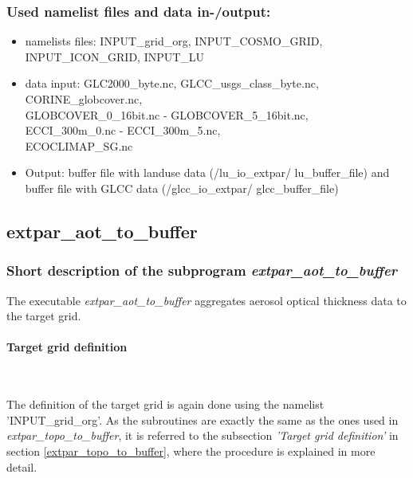 \documentclass[a4paper,10pt,DIV14,BCOR1cm,titlepage,twoside]{scrartcl}
\begin{document}
\subsubsection{Used namelist files and data in-/output:}
\begin{itemize}
 \item namelists files: INPUT\_grid\_org, INPUT\_COSMO\_GRID, INPUT\_ICON\_GRID, INPUT\_LU 
 \item data input:  GLC2000\_byte.nc, GLCC\_usgs\_class\_byte.nc, \\
     CORINE\_globcover.nc, \\ 
     GLOBCOVER\_0\_16bit.nc - GLOBCOVER\_5\_16bit.nc, \\
     ECCI\_300m\_0.nc -  ECCI\_300m\_5.nc, \\
     ECOCLIMAP\_SG.nc
 \item Output: buffer file with landuse data (/lu\_io\_extpar/ lu\_buffer\_file) and buffer file with GLCC data (/glcc\_io\_extpar/ glcc\_buffer\_file)
\end{itemize}

\subsection{extpar\_aot\_to\_buffer}\label{extpar_aot_to_buffer}
\subsubsection{Short description of the subprogram \textit{extpar\_aot\_to\_buffer}}
The executable \textit{extpar\_aot\_to\_buffer} aggregates aerosol optical thickness data to the target grid.\par\medskip\noindent
\paragraph{Target grid definition} \ \par\medskip\noindent
The definition of the target grid is again done using the namelist 'INPUT\_grid\_org'. As the subroutines are exactly the same as the ones used in \textit{extpar\_topo\_to\_buffer}, it is referred to the subsection \textit{'Target grid definition'} in section \ref{extpar_topo_to_buffer}, where the procedure is explained in more detail. \par\medskip\noindent
\end{document}
